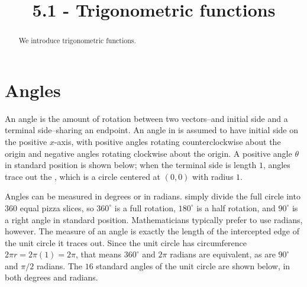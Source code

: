 \documentclass{ximera}
\title{5.1 - Trigonometric functions}
\begin{document}
\begin{abstract}
  We introduce trigonometric functions.
\end{abstract}
\maketitle

\section{Angles}
An angle is the amount of rotation between two vectors--and initial side and a terminal side--sharing an endpoint. An angle in  is assumed to have initial side on the positive $x$-axis, with positive angles rotating counterclockwise about the origin and negative angles rotating clockwise about the origin. A positive angle $\theta$ in standard position is shown below; when the terminal side is length $1$, angles trace out the , which is a circle centered at $(0,0)$ with radius $1$.

\begin{image}[2in]
\end{image}

Angles can be measured in degrees or in radians.  simply divide the full circle into $360$ equal pizza slices, so $360^{\circ}$ is a full rotation, $180^{\circ}$ is a half rotation, and $90^{\circ}$ is a right angle in standard position. Mathematicians typically prefer to use radians, however. The  measure of an angle is exactly the length of the intercepted edge of the unit circle it traces out. Since the unit circle has circumference $2\pi r=2\pi(1)=2\pi$, that means $360^{\circ}$ and $2\pi$ radians are equivalent, as are $90^{\circ}$ and $\pi/2$ radians.  The $16$ standard angles of the unit circle are shown below, in both degrees and radians.
\end{document}
